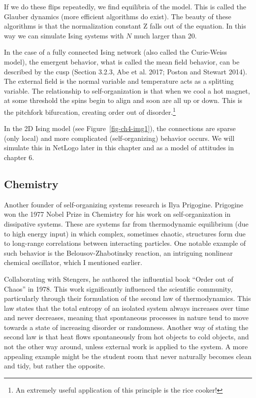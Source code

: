 \documentclass[
  letterpaper,
]{scrbook}
\begin{document}
If we do these flips repeatedly, we find equilibria of the model. This
is called the Glauber dynamics (more efficient algorithms do exist). The
beauty of these algorithms is that the normalization constant Z falls
out of the equation. In this way we can simulate Ising systems with
\(N\) much larger than 20.

In the case of a fully connected Ising network (also called the
Curie-Weiss model), the emergent behavior, what is called the mean field
behavior, can be described by the cusp (Section 3.2.3, Abe et al. 2017;
Poston and Stewart 2014). The external field is the normal variable and
temperature acts as a splitting variable. The relationship to
self-organization is that when we cool a hot magnet, at some threshold
the spins begin to align and soon are all up or down. This is the
pitchfork bifurcation, creating order out of disorder.\footnote{An
  extremely useful application of this principle is the rice cooker!}

In the 2D Ising model (see Figure~\ref{fig-ch4-img1}), the connections
are sparse (only local) and more complicated (self-organizing) behavior
occurs. We will simulate this in NetLogo later in this chapter and as a
model of attitudes in chapter 6.

\hypertarget{chemistry}{%
\subsection{Chemistry}\label{chemistry}}

Another founder of self-organizing systems research is Ilya Prigogine.
Prigogine won the 1977 Nobel Prize in Chemistry for his work on
self-organization in dissipative systems. These are systems far from
thermodynamic equilibrium (due to high energy input) in which complex,
sometimes chaotic, structures form due to long-range correlations
between interacting particles. One notable example of such behavior is
the Belousov-Zhabotinsky reaction, an intriguing nonlinear chemical
oscillator, which I mentioned earlier.

Collaborating with Stengers, he authored the influential book ``Order
out of Chaos'' in 1978. This work significantly influenced the
scientific community, particularly through their formulation of the
second law of thermodynamics. This law states that the total entropy of
an isolated system always increases over time and never decreases,
meaning that spontaneous processes in nature tend to move towards a
state of increasing disorder or randomness. Another way of stating the
second law is that heat flows spontaneously from hot objects to cold
objects, and not the other way around, unless external work is applied
to the system. A more appealing example might be the student room that
never naturally becomes clean and tidy, but rather the opposite.
\end{document}
